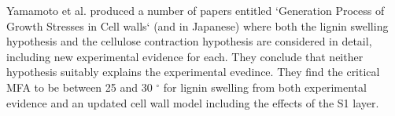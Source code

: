 Yamamoto et al. produced a number of papers entitled `Generation Process of
Growth Stresses in Cell walls` \cite{ISI:A1991FD97000001}\cite{ISI:A1992HP18200001}\cite{ISI:A1993LM28800002}\cite{ISI:A1993LE99600003}\cite{ISI:A1995QJ03000001} (and \cite{ISI:A1988R357800002}\cite{ISI:A1990EL71100002} in Japanese) where both the lignin swelling
hypothesis and the cellulose contraction hypothesis are considered in detail,
including new experimental evidence for each. They conclude that neither hypothesis suitably explains the experimental evedince. They find the critical MFA to be between 25 and 30 $^{\circ}$ for lignin swelling from both experimental evidence and an updated cell wall model including the effects of the S1 layer. 